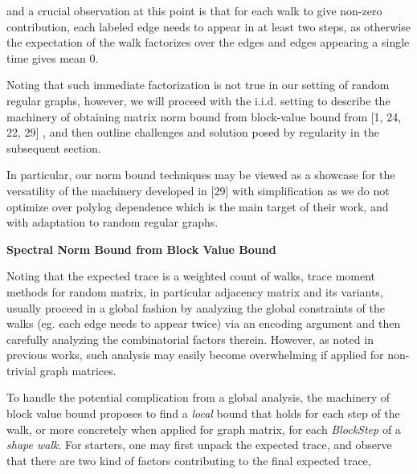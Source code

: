 and a crucial observation at this point
is that for each walk to give non-zero contribution, each labeled edge needs to appear in at least two steps, as otherwise the expectation of the walk factorizes over the edges and edges appearing a single time gives mean $0$.\par




Noting that such immediate factorization is not true in our setting of random regular graphs, however, we will proceed with the i.i.d. setting to describe the machinery of obtaining matrix norm bound from block-value bound from [1, 24, 22, 29] , and then outline challenges and solution posed by regularity in the subsequent section.\par




In particular, our norm bound techniques may be viewed as a showcase for the versatility of the machinery developed in [29] with simplification as we do not optimize over polylog dependence which is the main target of their work, and with adaptation to random regular graphs.\par





\par\medskip\noindent\textbf{Spectral Norm Bound from Block Value Bound}\par




Noting that the expected trace is a weighted count of walks, trace moment methods for random matrix, in particular adjacency matrix and its variants, usually proceed in a global fashion by analyzing the global constraints of the walks (eg. each edge needs to appear twice) via an encoding argument and then carefully analyzing the combinatorial factors therein. However, as noted in previous works, such analysis may easily become overwhelming if applied for non-trivial graph matrices.\par




To handle the potential complication from a global analysis, the machinery of block value bound proposes to find a \emph{local} bound that holds for each step of the walk, or more concretely when applied for graph matrix, for each \emph{BlockStep} of a \emph{shape walk}. For starters, one may first unpack the expected trace, and observe that there are two kind of factors contributing to the final expected trace,\par


